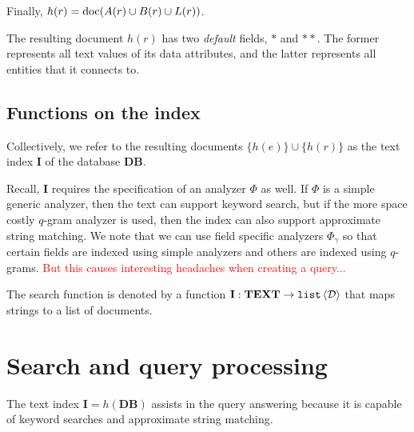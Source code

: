 \documentclass{article}
\begin{document}
Finally, $h(r) = \operatorname{doc}(A(r)\cup B(r)\cup L(r))$.

The resulting document $h(r)$ has two {\em default} fields, $*$ and $**$.  The
former represents all text values of its data attributes, and the latter
represents all entities that it connects to.

\subsection{Functions on the index}

Collectively, we refer to the resulting documents $\{h(e)\}\cup\{h(r)\}$ as the
text index $\textbf{I}$ of the database $\textbf{DB}$.

Recall, $\textbf{I}$ requires the specification of an analyzer $\Phi$ as well.
If $\Phi$ is a simple generic analyzer, then the text can support keyword
search, but if the more space costly $q$-gram analyzer is used, then the index
can also support approximate string matching.  We note that we can use field
specific analyzers $\Phi_\gamma$ so that certain fields are indexed using simple
analyzers and others are indexed using $q$-grams.  \textcolor{red}{But this
causes interesting headaches when creating a query...}

The search function is denoted by a function
$\mathbf{I}:\mathbf{TEXT}\to\mathtt{list}\left<\mathcal{D}\right>$ that maps strings to a list of
documents.

\section{Search and query processing}

The text index $\mathbf{I} = h(\mathbf{DB})$ assists in the query answering
because it is capable of keyword searches and approximate string matching.
\end{document}
